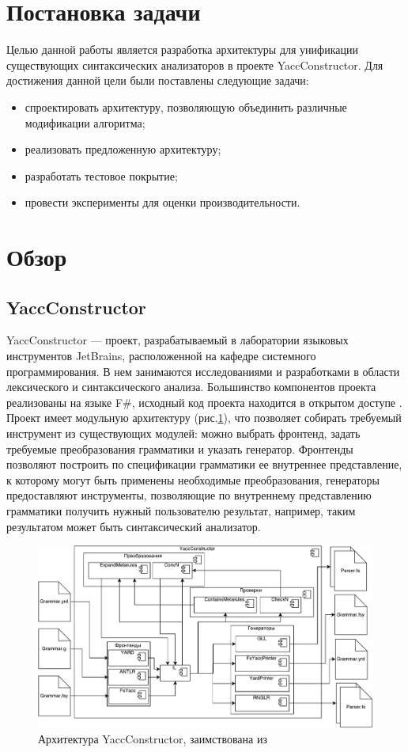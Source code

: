 \documentclass[14pt]{matmex-diploma}
\begin{document}
\section{Постановка задачи}
Целью данной работы является разработка архитектуры для унификации существующих синтаксических анализаторов в проекте \newline YaccConstructor. Для достижения данной цели были поставлены следующие задачи:
\begin{itemize}
    \item спроектировать архитектуру, позволяющую объединить различные модификации алгоритма;
    \item реализовать предложенную архитектуру;
    \item разработать тестовое покрытие;
    \item провести эксперименты для оценки производительности.
\end{itemize}

\section{Обзор}
\subsection{YaccConstructor}
YaccConstructor --- проект, разрабатываемый в лаборатории языковых инструментов JetBrains, расположенной на кафедре системного программирования. В нем занимаются исследованиями и разработками в области лексического и синтаксического анализа. Большинство компонентов проекта реализованы на языке F\#, исходный код проекта находится в открытом доступе \cite{YaccConstructor}. Проект имеет модульную архитектуру (рис.\ref{fig:YCArch}), что позволяет собирать требуемый инструмент из существующих модулей: можно выбрать фронтенд, задать требуемые преобразования грамматики и указать генератор. Фронтенды позволяют построить по спецификации грамматики ее внутреннее представление, к которому могут быть применены необходимые преобразования, генераторы предоставляют инструменты, позволяющие по внутреннему представлению грамматики получить нужный пользователю результат, например, таким результатом может быть синтаксический анализатор.

\begin{figure}[h]
	\includegraphics[width=\textwidth]{images/YCArch}
	\caption{Архитектура YaccConstructor, заимствована из \cite{gsvPhd}}
	\label{fig:YCArch}
\end{figure}
\end{document}

